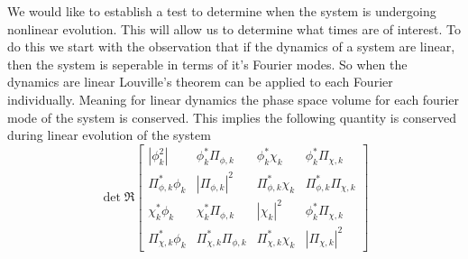 We would like to establish a test to determine when the system is undergoing nonlinear evolution.
This will allow us to determine what times are of interest.
To do this we start with the observation that if the dynamics of a system are linear, then the system is seperable in terms of it's Fourier modes.
So when the dynamics are linear Louville's theorem can be applied to each Fourier individually.
Meaning for linear dynamics the phase space volume for each fourier mode of the system is conserved.
This implies the following quantity is conserved during linear evolution of the system
\begin{equation}
  \det\Re\left[
    \begin{matrix}
      |\phi_k^2| & \phi_k^*\Pi_{\phi, k} & \phi_k^*\chi_k & \phi_k^*\Pi_{\chi, k} \\
      \Pi_{\phi,k}^*\phi_k & |\Pi_{\phi, k}|^2 & \Pi_{\phi,k}^*\chi_k & \Pi_{\phi,k}^*\Pi_{\chi, k} \\
      \chi_k^*\phi_k & \chi_k^*\Pi_{\phi, k} & |\chi_k|^2 & \phi_k^*\Pi_{\chi, k} \\
      \Pi_{\chi,k}^*\phi_k & \Pi_{\chi, k}^*\Pi_{\phi, k} & \Pi_{\chi,k}^*\chi_k & |\Pi_{\chi, k}|^2
    \end{matrix}
    \right]
\end{equation}

\Fphasespace
{}
\Fslice



